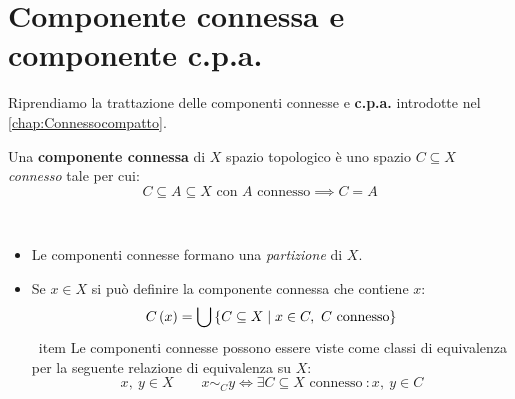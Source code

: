 \section{Componente connessa e componente c.p.a.}
Riprendiamo la trattazione delle componenti connesse e \textbf{c.p.a.} introdotte nel \autoref{chap:Connessocompatto}.
\begin{define}
	Una \textbf{componente connessa} di $X$ spazio topologico è uno spazio $C\subseteq X$ \textit{connesso} tale per cui:
	\begin{equation}
		C\subseteq A\subseteq X\text{ con }A\text{ connesso}\implies C=A 
	\end{equation} 
\end{define}
\begin{observe}~{}
\begin{itemize}
	\item Le componenti connesse formano una \textit{partizione} di $X$.
	\item Se $x\in X$ si può definire la componente connessa che contiene $x$:
	\begin{equation}
		C\left(x\right)=\mathop{{\bigcup}}\displaylimits\left\{C\subseteq X\mid x\in C,\ C\text{ connesso}\right\}
	\end{equation}
\ item Le componenti connesse possono essere viste come classi di equivalenza per la seguente relazione di equivalenza su $ X $:
	\begin{equation}
		x,\ y\in X\qquad x\sim_C y\iff \exists C\subseteq X\text{ connesso}\ \colon x,\ y\in C
	\end{equation}
\end{itemize}
\end{observe}
